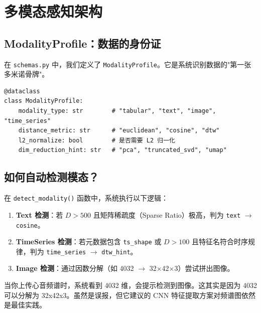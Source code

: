 \documentclass[11pt,a4paper]{ctexbook}
\begin{document}
\chapter{多模态感知架构}

\section{ModalityProfile：数据的身份证}

在 \texttt{schemas.py} 中，我们定义了 \texttt{ModalityProfile}。它是系统识别数据的"第一张多米诺骨牌"。

\begin{verbatim}
@dataclass
class ModalityProfile:
    modality_type: str        # "tabular", "text", "image", "time_series"
    distance_metric: str      # "euclidean", "cosine", "dtw"
    l2_normalize: bool        # 是否需要 L2 归一化
    dim_reduction_hint: str   # "pca", "truncated_svd", "umap"
\end{verbatim}

\section{如何自动检测模态？}

在 \texttt{detect\_modality()} 函数中，系统执行以下逻辑：
\begin{enumerate}
    \item \textbf{Text 检测}：若 $D > 500$ 且矩阵稀疏度（Sparse Ratio）极高，判为 \texttt{text} $\rightarrow$ \texttt{cosine}。
    \item \textbf{TimeSeries 检测}：若元数据包含 \texttt{ts\_shape} 或 $D > 100$ 且特征名符合时序规律，判为 \texttt{time\_series} $\rightarrow$ \texttt{dtw\_hint}。
    \item \textbf{Image 检测}：通过因数分解（如 4032 $\rightarrow$ 32×42×3）尝试拼出图像。
\end{enumerate}

\begin{tipbox}
    当你上传心音频谱时，系统看到 4032 维，会提示检测到图像。这其实是因为 4032 可以分解为 32x42x3。虽然是误报，但它建议的 CNN 特征提取方案对频谱图依然是最佳实践。
\end{tipbox}

\end{document}
